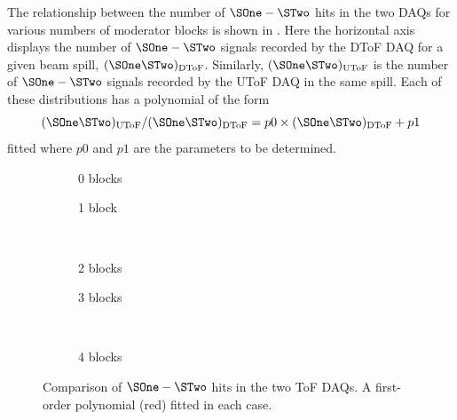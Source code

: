 The relationship between the number of $\SOne-\STwo$ hits in the two DAQs for various numbers of moderator blocks is shown in .
Here the horizontal axis displays the number of $\SOne-\STwo$ signals recorded by the DToF DAQ for a given beam spill, $(\SOne\STwo)_{\text{DToF}}$.
Similarly, $(\SOne\STwo)_{\text{UToF}}$ is the number of $\SOne-\STwo$ signals recorded by the UToF DAQ in the same spill.
Each of these distributions has a polynomial of the form
\begin{equation}
  (\SOne\STwo)_{\text{UToF}}/(\SOne\STwo)_{\text{DToF}} = p0 \times (\SOne\STwo)_{\text{DToF}} + p1
\end{equation}
fitted where $p0$ and $p1$ are the parameters to be determined.

\begin{figure}[t]
  \begin{subfigure}[t]{.5\textwidth}
    \begin{adjustbox}{max totalsize=\textwidth, center}
      
    \end{adjustbox}
    \caption{0 blocks}
  \end{subfigure}
  \hfill
  \begin{subfigure}[t]{.5\textwidth}
    \begin{adjustbox}{max totalsize=\textwidth, center}
            
    \end{adjustbox}
    \caption{1 block}
  \end{subfigure} \\
  \begin{subfigure}[t]{.5\textwidth}
    \begin{adjustbox}{max totalsize=\textwidth, center}
      
    \end{adjustbox}
    \caption{2 blocks}
  \end{subfigure}
  \hfill
  \begin{subfigure}[t]{.5\textwidth}
    \begin{adjustbox}{max totalsize=\textwidth, center}
      
    \end{adjustbox}
    \caption{3 blocks}
  \end{subfigure} \\
  \begin{subfigure}[t]{\textwidth}
    \begin{adjustbox}{max totalsize=.5\textwidth, center}
      
    \end{adjustbox}
    \caption{4 blocks}
  \end{subfigure}
  
  \caption[Comparison of $\SOne-\STwo$ hits in the two ToF DAQs]{Comparison of $\SOne-\STwo$ hits in the two ToF DAQs. A first-order polynomial (red) fitted in each case.}
  \label{fig:s1s2DeadtimeComp}
\end{figure}

